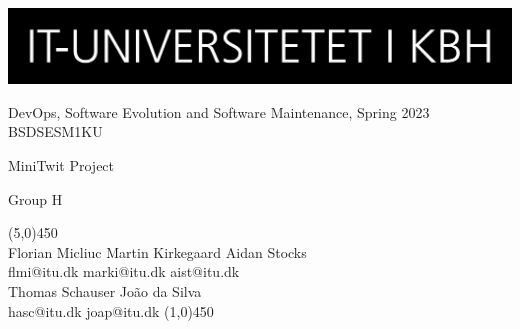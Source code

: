 \begin{center}
        \vspace*{3.0cm}
        \includegraphics[scale=0.15]{images/ITU_logo_KBH_DK.jpg}\\
        \vspace{3.0cm}
        
        \Large DevOps, Software Evolution and Software Maintenance, Spring 2023\\
        \large BSDSESM1KU\\
        
        \vspace{-0.2cm}
        
        \Huge MiniTwit Project \\
        \vspace{1cm}
        
        \Large Group H\\
        \vspace{-0.5cm}
        
        \line(5,0){450}\\
        \vspace{-0.2cm}
        \Large Florian Micliuc \hspace{1cm} Martin Kirkegaard \hspace{1cm} Aidan Stocks \\
        \large flmi@itu.dk \hspace*{2.5cm} marki@itu.dk  \hspace*{2.5cm} aist@itu.dk\\
        \Large Thomas Schauser \hspace{1cm} João da Silva\\
        \vspace{-0.2cm}
        \large \hspace{0.5cm} hasc@itu.dk \hspace*{2.2cm} joap@itu.dk 
        \line(1,0){450}\\
\end{center}